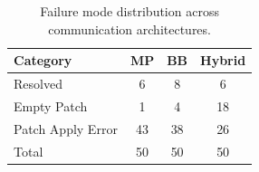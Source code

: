 \begin{table}[t]
\centering
\caption{Failure mode distribution across communication architectures.}
\label{tab:failures}
\begin{tabular}{lccc}
\toprule
\textbf{Category} & \textbf{MP} & \textbf{BB} & \textbf{Hybrid} \\
\midrule
Resolved           & 6 & 8 & 6 \\
Empty Patch        & 1 & 4 & 18 \\
Patch Apply Error  & 43 & 38 & 26 \\
\midrule
Total              & 50 & 50 & 50 \\
\bottomrule
\end{tabular}
\end{table}